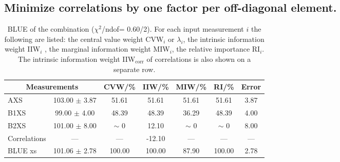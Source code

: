 \subsection{Minimize correlations by one factor per off-diagonal element.}
\begin{table}[H]
\scriptsize
\begin{center}
\renewcommand{\arraystretch}{1.1}
\begin{tabular}{|lc|c|c|c|c|c|}
\hline
\multicolumn{2}{|c|}{Measurements} & CVW/\%  & IIW/\%  & MIW/\%  & RI/\%  & {\tiny Error}\\
\hline
AXS &     103.00 $\pm$       3.87 &      51.61 &      51.61 &      51.61 &      51.61 &       3.87\\
B1XS &      99.00 $\pm$       4.00 &      48.39 &      48.39 &      36.29 &      48.39 &       4.00\\
B2XS &     101.00 $\pm$       8.00 &  {\tiny $\sim$ }0 &      12.10 &  {\tiny $\sim$ }0 &  {\tiny $\sim$ }0 &       8.00\\
Correlations & --- & --- &     -12.10 & --- & --- & ---\\
\hline
BLUE {\tiny xs} &     101.06 $\pm$       2.78 &     100.00 &     100.00 &      87.90 &     100.00 &       2.78\\
\hline
\end{tabular}
\caption{BLUE of the combination ($\chi^2$/ndof=      0.60/2).
 For each input measurement $i$ the following are listed: the central value weight CVW$_i$ or $\lambda_i$, the intrinsic information weight IIW$_i$ , the marginal information weight MIW$_i$, the relative importance RI$_i$. The intrinsic information weight IIW$_{\mathrm{corr}}$ of correlations is also shown on a separate row.}
\renewcommand{\arraystretch}{1}
\end{center}
\end{table}
